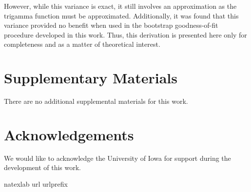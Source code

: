 \documentclass[12pt]{article} %
\theoremstyle{definition}
\begin{document}
However, while this variance is exact, it still involves an approximation as the trigamma function must be approximated. Additionally, it was found that
this variance provided no benefit when used in the bootstrap goodness-of-fit procedure developed in this work. Thus, this derivation is presented here only
for completeness and as a matter of theoretical interest.

\section*{Supplementary Materials}

There are no additional supplemental materials for this work.
\par
\section*{Acknowledgements}

We would like to acknowledge the University of Iowa for support during the development of this work.
\par



\bibhang=1.7pc
\bibsep=2pt
\fontsize{9}{14pt plus.8pt minus .6pt}\selectfont
\renewcommand\bibname{\large \bf References}
\expandafter\ifx\csname
natexlab\endcsname\relax\def\natexlab#1{#1}\fi
\expandafter\ifx\csname url\endcsname\relax
  \def\url#1{\texttt{#1}}\fi
\expandafter\ifx\csname urlprefix\endcsname\relax\def\urlprefix{URL}\fi



\end{document}
